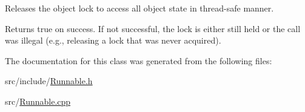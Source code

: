 Releases the object lock to access all object state in thread-\/safe manner. 

\begin{DoxyReturn}{Returns}
true on success. If not successful, the lock is either still held or the call was illegal (e.\-g., releasing a lock that was never acquired). 
\end{DoxyReturn}


The documentation for this class was generated from the following files\-:\begin{DoxyCompactItemize}
\item 
src/include/\hyperlink{_runnable_8h}{Runnable.\-h}\item 
src/\hyperlink{_runnable_8cpp}{Runnable.\-cpp}\end{DoxyCompactItemize}
